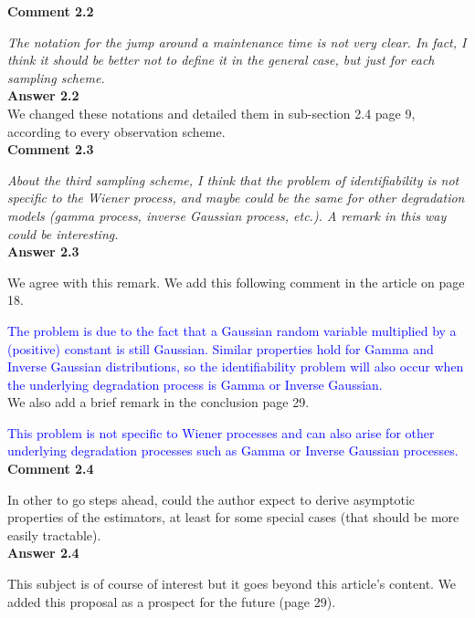 { \bf Comment 2.2 }

{\it The notation for the jump around a maintenance time is not very clear. In fact, I think it should be better not to define it in the general case, but just for each sampling scheme.}\\

{ \bf Answer 2.2 }	\\

We changed these notations and detailed them in sub-section 2.4 page 9, according to every observation scheme.\\


{ \bf Comment 2.3}

{\it About the third sampling scheme, I think that the problem of identifiability is not specific to the Wiener process, and maybe could be the same for other degradation models (gamma process, inverse Gaussian process, etc.). A remark in this way could be interesting.}\\

{ \bf Answer 2.3 }


We agree with this remark. We add this following comment in the article on page 18. 

\textcolor{blue}{The problem is due to the fact that a Gaussian random variable multiplied by a (positive) constant is still Gaussian. Similar properties hold for Gamma and Inverse Gaussian distributions, so the identifiability problem will also occur when the underlying degradation process is Gamma or Inverse Gaussian.}\\

\noindent We also add a brief remark in the conclusion page 29.


\textcolor{blue}{This problem is not specific to Wiener processes and can also arise for other underlying degradation processes such as Gamma or Inverse Gaussian processes. } \\




{ \bf Comment 2.4 } 

In other to go steps ahead, could the author expect to derive asymptotic properties of the estimators, at least for some special cases (that should be more easily tractable).\\

{ \bf Answer 2.4 }

This subject is of course of interest but it goes beyond this article's content. We added this proposal as a prospect for the future (page 29). \\



